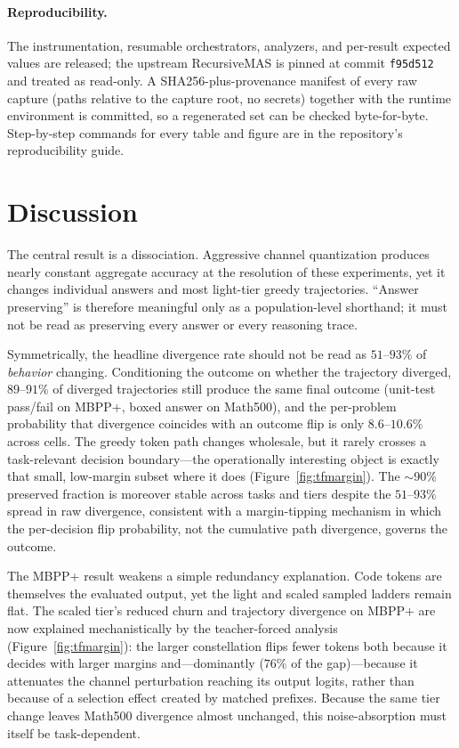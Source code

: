 \documentclass{article}
\begin{document}
\paragraph{Reproducibility.}
The instrumentation, resumable orchestrators, analyzers, and per-result expected values are
released; the upstream RecursiveMAS is pinned at commit \texttt{f95d512} and treated as read-only.
A SHA256-plus-provenance manifest of every raw capture (paths relative to the capture root, no
secrets) together with the runtime environment is committed, so a regenerated set can be checked
byte-for-byte. Step-by-step commands for every table and figure are in the repository's
reproducibility guide.

\section{Discussion}

The central result is a dissociation. Aggressive channel quantization produces
nearly constant aggregate accuracy at the resolution of these experiments, yet it
changes individual answers and most light-tier greedy trajectories. ``Answer
preserving'' is therefore meaningful only as a population-level shorthand; it must
not be read as preserving every answer or every reasoning trace.

Symmetrically, the headline divergence rate should not be read as $51$--$93\%$ of
\emph{behavior} changing. Conditioning the outcome on whether the trajectory diverged,
$89$--$91\%$ of diverged trajectories still produce the same final outcome (unit-test pass/fail on
MBPP+, boxed answer on Math500), and the per-problem probability that divergence coincides with an
outcome flip is only $8.6$--$10.6\%$ across cells. The greedy token path changes wholesale, but it
rarely crosses a task-relevant decision boundary---the operationally interesting object is exactly
that small, low-margin subset where it does (Figure~\ref{fig:tfmargin}). The $\sim$90\% preserved
fraction is moreover stable across tasks and tiers despite the $51$--$93\%$ spread in raw
divergence, consistent with a margin-tipping mechanism in which the per-decision flip probability,
not the cumulative path divergence, governs the outcome.

The MBPP+ result weakens a simple redundancy explanation. Code tokens are themselves
the evaluated output, yet the light and scaled sampled ladders remain flat. The scaled
tier's reduced churn and trajectory divergence on MBPP+ are now explained mechanistically by the
teacher-forced analysis (Figure~\ref{fig:tfmargin}): the larger constellation flips fewer tokens
both because it decides with larger margins and---dominantly ($76\%$ of the gap)---because it
attenuates the channel perturbation reaching its output logits, rather than because of a selection
effect created by matched prefixes. Because the same tier change leaves Math500 divergence almost
unchanged, this noise-absorption must itself be task-dependent.
\end{document}
